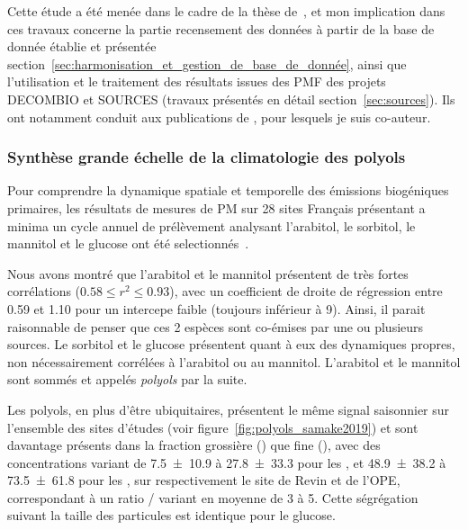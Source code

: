 \begin{tcolorbox}[colback=red!5!white,colframe=Melon,title=Note]
    Cette étude a été menée dans le cadre de la thèse de~\cite{samakeAtmospheric2019}, et
    mon implication dans ces travaux concerne la partie recensement des données à partir
    de la base de donnée établie et présentée
    section~\ref{sec:harmonisation_et_gestion_de_base_de_donnée}, ainsi que l'utilisation
    et le traitement des résultats issues des PMF des projets DECOMBIO et SOURCES
    (travaux présentés en détail section~\ref{sec:sources}).
    Ils ont notamment conduit aux publications de
    \cite{samakeArabitol2019,samakePolyols2019,samakeHigh2020}, pour lesquels je suis
    co-auteur.
\end{tcolorbox}

\subsubsection{Synthèse grande échelle de la climatologie des polyols}%
\label{ssub:synthèse_grande_échelle_de_la_climatologie_des_polyols}

Pour comprendre la dynamique spatiale et temporelle des émissions biogéniques primaires,
les résultats de mesures de PM sur 28 sites Français présentant a minima un cycle annuel
de prélèvement analysant l'arabitol, le sorbitol, le mannitol et le glucose ont été
selectionnés~\autocite{samakePolyols2019}.

Nous avons montré que l'arabitol et le mannitol présentent de très fortes corrélations 
($0.58 \leq r^2 \leq 0.93$), avec un coefficient de droite de régression entre 0.59 et
1.10 pour un intercepe faible (toujours inférieur à \SI{9}{\ngm}). Ainsi, il parait
raisonnable de penser que ces 2 espèces sont co-émises par une ou plusieurs sources.
Le sorbitol et le glucose présentent quant à eux des dynamiques propres, non
nécessairement corrélées à l'arabitol ou au mannitol.
L'arabitol et le mannitol sont sommés et appelés \textit{polyols} par la suite.

Les polyols, en plus d'être ubiquitaires, présentent le même signal saisonnier sur l'ensemble
des sites d'études (voir figure~\ref{fig:polyols_samake2019}) et sont davantage présents
dans la fraction grossière (\PMdix) que fine (\PMdc), avec des concentrations variant de 
\SI{7.5\pm10.9}{\ngm} à \SI{27.8\pm33.3}{\ngm} pour les \PMdc, et
\SI{48.9\pm38.2}{\ngm} à \SI{73.5\pm61.8}{\ngm} pour les \PMdix, sur respectivement le site de
Revin et de l'OPE, correspondant à un ratio \PMdix/\PMdc{} variant en moyenne de 3 à 5.
Cette ségrégation suivant la taille des particules est identique pour le glucose.

